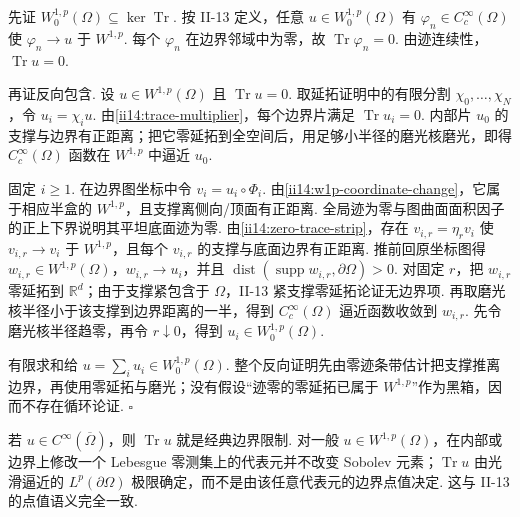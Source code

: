 \begin{FAProof}
先证 \(\displaystyle W_0^{1,p}(\Omega)\subseteq\ker\operatorname{Tr}\). 按 II-13 定义，任意 \(\displaystyle u\in W_0^{1,p}(\Omega)\) 有 \(\displaystyle\varphi_n\in C_c^\infty(\Omega)\) 使 \(\displaystyle\varphi_n\to u\) 于 \(\displaystyle W^{1,p}\). 每个 \(\displaystyle\varphi_n\) 在边界邻域中为零，故 \(\displaystyle\operatorname{Tr}\varphi_n=0\). 由迹连续性，\(\displaystyle\operatorname{Tr}u=0\).

再证反向包含. 设 \(\displaystyle u\in W^{1,p}(\Omega)\) 且 \(\displaystyle\operatorname{Tr}u=0\). 取延拓证明中的有限分割 \(\displaystyle\chi_0,\dots,\chi_N\)，令 \(\displaystyle u_i=\chi_i u\). 由\autoref{ii14:trace-multiplier}，每个边界片满足 \(\displaystyle\operatorname{Tr}u_i=0\). 内部片 \(\displaystyle u_0\) 的支撑与边界有正距离；把它零延拓到全空间后，用足够小半径的磨光核磨光，即得 \(\displaystyle C_c^\infty(\Omega)\) 函数在 \(\displaystyle W^{1,p}\) 中逼近 \(\displaystyle u_0\).

固定 \(\displaystyle i\geqslant1\). 在边界图坐标中令 \(\displaystyle v_i=u_i\circ\Phi_i\). 由\autoref{ii14:w1p-coordinate-change}，它属于相应半盒的 \(\displaystyle W^{1,p}\)，且支撑离侧向/顶面有正距离. 全局迹为零与图曲面面积因子的正上下界说明其平坦底面迹为零. 由\autoref{ii14:zero-trace-strip}，存在 \(\displaystyle v_{i,r}=\eta_rv_i\) 使 \(\displaystyle v_{i,r}\to v_i\) 于 \(\displaystyle W^{1,p}\)，且每个 \(\displaystyle v_{i,r}\) 的支撑与底面边界有正距离. 推前回原坐标图得 \(\displaystyle w_{i,r}\in W^{1,p}(\Omega)\)，\(\displaystyle w_{i,r}\to u_i\)，并且 \(\displaystyle\operatorname{dist}(\operatorname{supp}w_{i,r},\partial\Omega)>0\). 对固定 \(\displaystyle r\)，把 \(\displaystyle w_{i,r}\) 零延拓到 \(\displaystyle\mathbb R^d\)；由于支撑紧包含于 \(\displaystyle\Omega\)，II-13 紧支撑零延拓论证无边界项. 再取磨光核半径小于该支撑到边界距离的一半，得到 \(\displaystyle C_c^\infty(\Omega)\) 逼近函数收敛到 \(\displaystyle w_{i,r}\). 先令磨光核半径趋零，再令 \(\displaystyle r\downarrow0\)，得到 \(\displaystyle u_i\in W_0^{1,p}(\Omega)\).

有限求和给 \(\displaystyle u=\sum_i u_i\in W_0^{1,p}(\Omega)\). 整个反向证明先由零迹条带估计把支撑推离边界，再使用零延拓与磨光；没有假设“迹零的零延拓已属于 \(\displaystyle W^{1,p}\)”作为黑箱，因而不存在循环论证.
\hfill\(\square\)
\end{FAProof}

\begin{FAExample}[光滑边界值与等价类迹]
若 \(\displaystyle u\in C^\infty(\overline\Omega)\)，则 \(\displaystyle\operatorname{Tr}u\) 就是经典边界限制. 对一般 \(\displaystyle u\in W^{1,p}(\Omega)\)，在内部或边界上修改一个 Lebesgue 零测集上的代表元并不改变 Sobolev 元素；\(\displaystyle\operatorname{Tr}u\) 由光滑逼近的 \(\displaystyle L^p(\partial\Omega)\) 极限确定，而不是由该任意代表元的边界点值决定. 这与 II-13 的点值语义完全一致.
\end{FAExample}

